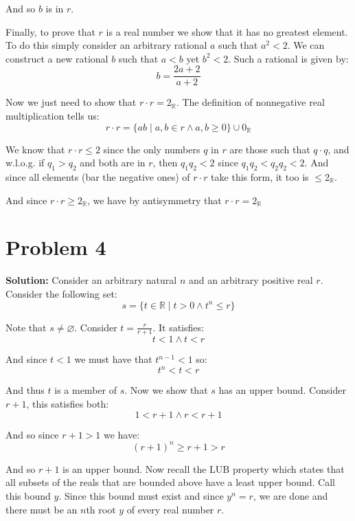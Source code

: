 \documentclass{article}
\begin{document}
And so $b$ is in $r$.

Finally, to prove that $r$ is a real number we show that it has no greatest element. To do this simply consider an arbitrary rational $a$ such that $a^2<2$. We can construct a new rational $b$ such that $a<b$ yet $b^2<2$. Such a rational is given by:
\begin{equation*}
    b=\frac{2a+2}{a+2}
\end{equation*}

Now we just need to show that $r\cdot r=2_\mathbb R$. The definition of nonnegative real multiplication tells us:
\begin{equation*}
    r\cdot r=\{ab\mid a,b\in r\wedge a,b\ge 0\}\cup0_\mathbb R
\end{equation*}

We know that $r\cdot r\le2$ since the only numbers $q$ in $r$ are those such that $q\cdot q$, and w.l.o.g. if $q_1>q_2$ and both are in $r$, then $q_1q_2<2$ since $q_1q_2<q_2q_2<2$. And since all elements (bar the negative ones) of $r\cdot r$ take this form, it too is $\le 2_\mathbb R$.

And since $r\cdot r\ge 2_\mathbb R$, we have by antisymmetry that $r\cdot r=2_\mathbb R$

\section*{Problem 4}
\noindent\textbf{Solution:} Consider an arbitrary natural $n$ and an arbitrary positive real $r$. Consider the following set:
\begin{equation*}
    s=\{t\in\mathbb R\mid t>0\wedge t^n\le r\}
\end{equation*}

Note that $s\not=\varnothing$. Consider $t=\frac{r}{r+1}$. It satisfies:
\begin{equation*}
    t<1\wedge t<r
\end{equation*}

And since $t<1$ we must have that $t^{n-1}<1$ so:
\begin{equation*}
    t^n<t<r
\end{equation*}

And thus $t$ is a member of $s$. Now we show that $s$ has an upper bound. Consider $r+1$, this satisfies both:
\begin{equation*}
    1<r+1\wedge r<r+1
\end{equation*}

And so since $r+1>1$ we have:
\begin{equation*}
    (r+1)^n\ge r+1>r
\end{equation*}

And so $r+1$ is an upper bound. Now recall the LUB property which states that all subsets of the reals that are bounded above have a least upper bound. Call this bound $y$. Since this bound must exist and since $y^n=r$, we are done and there must be an $n$th root $y$ of every real number $r$. 
\end{document}
